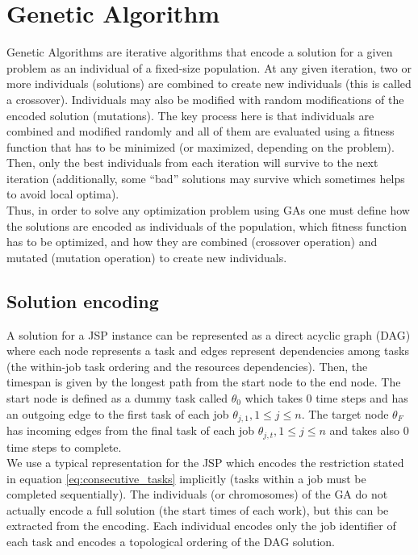 \documentclass[10pt,a4paper]{article}
\begin{document}
\section{Genetic Algorithm}
Genetic Algorithms are iterative algorithms that encode a solution for a given problem as an individual of a fixed-size population. At any given iteration, two or more individuals (solutions) are combined to create new individuals (this is called a crossover). Individuals may also be modified with random modifications of the encoded solution (mutations). The key process here is that individuals are combined and modified randomly and all of them are evaluated using a fitness function that has to be minimized (or maximized, depending on the problem). Then, only the best individuals from each iteration will survive to the next iteration (additionally, some ``bad'' solutions may survive which sometimes helps to avoid local optima).\\

Thus, in order to solve any optimization problem using GAs one must define how the solutions are encoded as individuals of the population, which fitness function has to be optimized, and how they are combined (crossover operation) and mutated (mutation operation) to create new individuals.

\subsection{Solution encoding}
A solution for a JSP instance can be represented as a direct acyclic graph (DAG) where each node represents a task and edges represent dependencies among tasks (the within-job task ordering and the resources dependencies). Then, the timespan is given by the longest path from the start node to the end node. The start node is defined as a dummy task called $\theta_0$ which takes 0 time steps and has an outgoing edge to the first task of each job $\theta_{j,1}, 1 \leq j \leq n$. The target node $\theta_F$ has incoming edges from the final task of each job $\theta_{j,t}, 1 \leq j \leq n$ and takes also 0 time steps to complete.\\

We use a typical representation for the JSP which encodes the restriction stated in equation \ref{eq:consecutive_tasks} implicitly (tasks within a job must be completed sequentially). The individuals (or chromosomes) of the GA do not actually encode a full solution (the start times of each work), but this can be extracted from the encoding. Each individual encodes only the job identifier of each task and encodes a topological ordering of the DAG solution.\\
\end{document}

